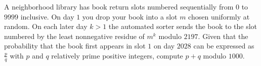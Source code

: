 A neighborhood library has book return slots numbered sequentially from $0$ to $9999$ inclusive. On day $1$ you drop your book into a slot $m$ chosen uniformly at random. On each later day $k>1$ the automated sorter sends the book to the slot numbered by the least nonnegative residue of $m^k$ modulo $2197$. Given that the probability that the book first appears in slot $1$ on day $2028$ can be expressed as $\frac{p}{q}$ with $p$ and $q$ relatively prime positive integers, compute $p+q$ modulo $1000$.
